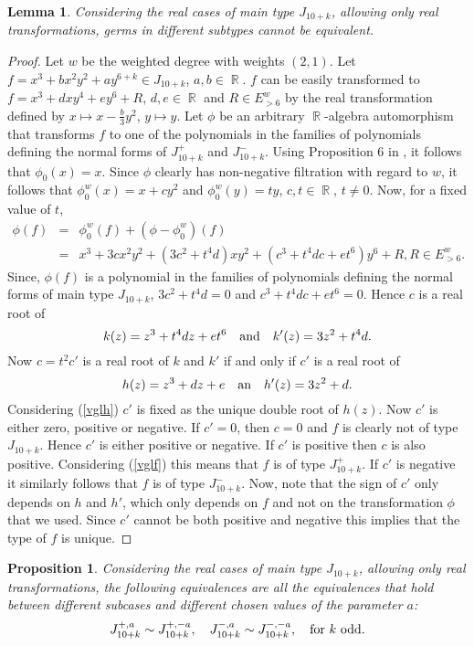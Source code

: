 \documentclass[noend]{amsproc}
\newtheorem{prop}[theorem]{Proposition}
\newtheorem{lemma}[theorem]{Lemma}
\theoremstyle{definition}
\DeclareMathOperator{\R}{\mathbb{R}}
\begin{document}
\begin{lemma}
Considering the real cases of main type $J_{10+k}$, allowing only real transformations, germs in different subtypes cannot be equivalent.
\end{lemma}
\begin{proof}
Let $w$ be the weighted degree with weights $(2,1)$. Let $f=x^3+bx^2y^2+ay^{6+k}\in J_{10+k}$, $a,b\in\R$. $f$ can be easily transformed to $f=x^3+dxy^4+ey^6+ R$, $d,e\in \R$ and $R\in E^w_{>6}$ by the real transformation defined by $x\mapsto x-\frac{b}{3}y^2$, $y\mapsto y$. Let $\phi$ be an arbitrary $\R$-algebra automorphism that transforms $f$ to one of the polynomials in the families of polynomials defining the normal forms of $J_{10+k}^+$ and $J_{10+k}^-$. Using Proposition 6 in \cite{MS2013}, it follows that $\phi_0(x)=x$. Since $\phi$ clearly has non-negative filtration with regard to $w$, it follows that $\phi_0^{w}(x)=x+cy^2$ and $\phi^w_0(y)=ty$, $c,t\in\R$, $t\neq 0$. Now, for a fixed value of $t$,
\begin{eqnarray}\label{vglf}
\phi(f)&=&\phi^w_0(f)+(\phi-\phi^w_0)(f)\nonumber\\
&=&x^3+3cx^2y^2+(3c^2+t^4d)xy^2+(c^3+t^4dc+et^6)y^6+ R, R\in E^w_{>6}.
\end{eqnarray}  
Since, $\phi(f)$ is a polynomial in the families of polynomials defining the normal forms of main type $J_{10+k}$, $3c^2+t^4d=0$ and $c^3+t^4dc+et^6=0$. Hence $c$ is a real root of 
\begin{equation*}
k(z)=z^3+t^4dz+et^6\quad\textnormal{and}\quad k'(z)=3z^2+t^4d.
\end{equation*} 
Now $c=t^2c'$ is a real root of $k$ and $k'$ if and only if $c'$ is a real root of 
\begin{equation}\label{vglh}
h(z)=z^3+dz+e\quad\textnormal{an}\quad h'(z)=3z^2+d.
\end{equation}
Considering (\ref{vglh}) $c'$ is fixed as the unique double root of $h(z)$. Now $c'$ is either zero, positive or negative. If $c'=0$, then $c=0$ and $f$ is clearly not of type $J_{10+k}$. Hence $c'$ is either positive or negative. If $c'$ is positive then $c$ is also positive. Considering (\ref{vglf}) this means that $f$ is of type $J_{10+k}^+$. If $c'$ is negative it similarly follows that $f$ is of type $J_{10+k}^-$. Now, note that the sign of $c'$ only depends on $h$ and $h'$, which only depends on $f$ and not on the transformation $\phi$ that we used. Since $c'$ cannot be both positive and negative this implies that the type of $f$ is unique.
\end{proof}
\begin{prop}
Considering the real cases of main type $J_{10+k}$, allowing only real transformations, the following equivalences are all the equivalences that hold between different subcases and different chosen values of the parameter $a$:
\[J_{10+k}^{+,a}\sim J_{10+k}^{+,-a},\quad J_{10+k}^{-,a}\sim J_{10+k}^{-,-a},\quad \textnormal{for $k$ odd}.\]
\end{prop}
\end{document}
